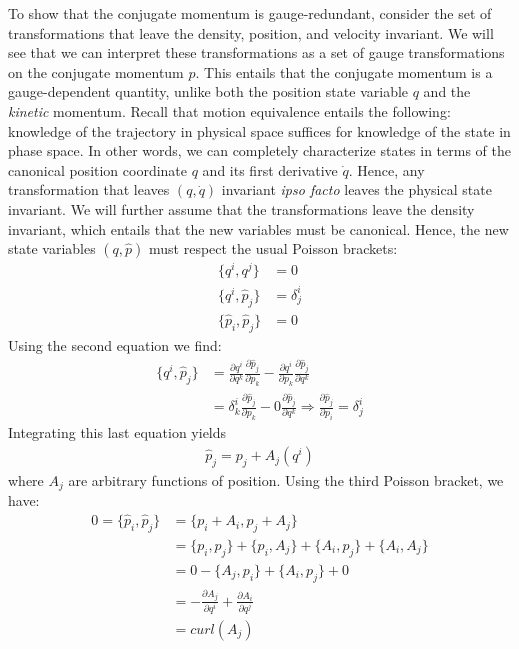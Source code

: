 \documentclass[letterpaper]{article}
\begin{document}
To show that the conjugate momentum is gauge-redundant, consider the set of transformations that leave the density, position, and velocity invariant. We will see that we can interpret these transformations as a set of gauge transformations on the conjugate momentum $p $. This entails that the conjugate momentum is a gauge-dependent quantity, unlike both the position state variable $q$ and the \textit{kinetic} momentum. Recall that motion equivalence entails the following: knowledge of the trajectory in physical space suffices for knowledge of the state in phase space. In other words, we can completely characterize states in terms of the canonical position coordinate $q$ and its first derivative $\dot{q}$. Hence, any transformation that leaves $(q,\dot{q}) $ invariant \textit{ipso facto} leaves the physical state invariant. We will further assume that the transformations leave the density invariant, which entails that the new variables must be canonical. Hence, the new state variables $(q, \hat{p})$ must respect the usual Poisson brackets:
\begin{equation}
\begin{aligned}
	\{q^i, q^j\} &= 0 \\
	\{q^i, \hat{p}_j\} &= \delta^i_j \\
	\{\hat{p}_i, \hat{p}_j\} &= 0
\end{aligned}
\end{equation}
Using the second equation we find:
\begin{equation}
\begin{aligned}
	\{q^i, \hat{p}_j\} &= \frac{\partial q^i}{\partial q^k} \frac{\partial \hat{p}_j}{\partial p_k} - \frac{\partial q^i}{\partial p_k} \frac{\partial \hat{p}_j}{\partial q^k} \\
	&= \delta^i_k \frac{\partial \hat{p}_j}{\partial p_k} - 0 \frac{\partial \hat{p}_j}{\partial q^k} \Rightarrow \frac{\partial \hat{p}_j}{\partial p_i} = \delta^i_j
\end{aligned}
\end{equation}
Integrating this last equation yields
\begin{equation}
\begin{aligned}
\hat{p}_j = p_j + A_j(q^i)
\end{aligned}
\end{equation}
where $A_j$ are arbitrary functions of position. Using the third Poisson bracket, we have:
\begin{equation}
\begin{aligned}
0 = \{\hat{p}_i, \hat{p}_j\} &= \{p_i + A_i, p_j + A_j\} \\
&= \{p_i, p_j \} + \{p_i , A_j\} + \{A_i, p_j \} + \{A_i, A_j\} \\
&= 0 - \{A_j, p_i\} + \{A_i, p_j \} + 0 \\
&= - \frac{\partial A_j}{\partial q^i} + \frac{\partial A_i}{\partial q^j} \\
&= curl(A_j) \\
\end{aligned}
\end{equation}
\end{document}
